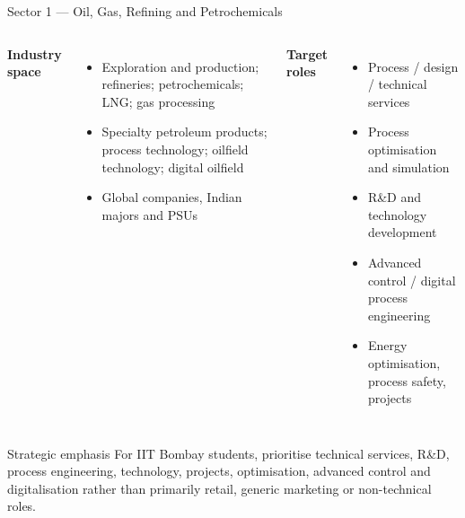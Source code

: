 \documentclass[aspectratio=169,11pt]{beamer}
\begin{document}
\begin{frame}{Sector 1 — Oil, Gas, Refining and Petrochemicals}
\begin{columns}[T]
\textbf{Industry space}
\begin{itemize}
\item Exploration and production; refineries; petrochemicals; LNG; gas processing
\item Specialty petroleum products; process technology; oilfield technology; digital oilfield
\item Global companies, Indian majors and PSUs
\end{itemize}
\textbf{Target roles}
\begin{itemize}
\item Process / design / technical services
\item Process optimisation and simulation
\item R\&D and technology development
\item Advanced control / digital process engineering
\item Energy optimisation, process safety, projects
\end{itemize}
\end{columns}
\vspace{3mm}
\begin{block}{Strategic emphasis}
For IIT Bombay students, prioritise technical services, R\&D, process engineering, technology, projects, optimisation, advanced control and digitalisation rather than primarily retail, generic marketing or non-technical roles.
\end{block}
\end{frame}
\end{document}
